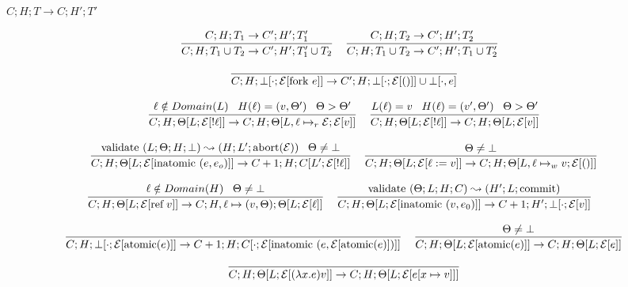 \documentclass[9pt]{article}
\newcommand{\eval}[1]{\mathcal{E}[#1]}
\newcommand{\ctxt}[0]{\mathcal{E}}
\newcommand{\loc}[0]{\ell}
\newcommand{\atomic}[1]{\text{atomic}(#1)}
\newcommand{\alloc}[1]{\text{ref} \; #1}
\newcommand{\commit}[0]{\text{commit}}
\newcommand{\abort}[1]{\text{abort}(#1)}
\newcommand{\fork}[1]{\text{fork } #1}
\newcommand{\inatomic}[1]{\text{inatomic }(#1)}
\newcommand{\validate}[1]{\text{validate }(#1)}
\begin{document}
$\boxed{C; H; T \rightarrow C; H' ;T'}$

\[%
\infer[]{C; H; T_1 \cup T_2 \rightarrow C'; H'; T_1' \cup T_2}{C; H; T_1 \rightarrow C'; H'; T_1'} \;\;\;
\infer[]{C; H; T_1 \cup T_2 \rightarrow C'; H'; T_1 \cup T_2'}{C; H; T_2 \rightarrow C'; H'; T_2'} \;\;\; 
\]

\[%
\infer[]{C; H; \bot[\cdot; \eval{\fork{e}}] \rightarrow C'; H; \bot[\cdot; \eval{()}] \cup \bot[\cdot, e]}{}
\]

\[%
\infer[]{C; H; \Theta[L; \eval{!\loc}] \rightarrow C; H; \Theta[L, \loc \mapsto_r \ctxt; \eval{v}]}{\loc \notin Domain(L) \;\;\; H(\loc) = (v, \Theta') \;\;\; \Theta > \Theta'}  \;\;\;
\infer[]{C; H; \Theta[L; \eval{!\loc}] \rightarrow C; H; \Theta[L; \eval{v}]}{L(\loc) = v \;\;\; H(\loc) = (v', \Theta') \;\;\; \Theta > \Theta'} 
\]

\[%
\infer[]{C; H; \Theta[L; \eval{\inatomic{e, e_o}}] \rightarrow C+1; H; C[L'; \ctxt[!\loc]]}{\validate{L; \Theta; H; \bot} \leadsto (H; L'; \abort{\ctxt}) \;\;\; \Theta \neq \bot} \;\;\;
\infer[]{C; H; \Theta[L; \eval{\loc := v}] \rightarrow C; H; \Theta[L, \loc \mapsto_w v; \eval{()}]}{\Theta \neq \bot} 
\]

\[%
\infer[]{C; H; \Theta[L; \eval{\alloc{v}}] \rightarrow C; H, \loc \mapsto (v, \Theta); \Theta[L;  \eval{\loc}]}{\loc \notin Domain(H) \;\;\; \Theta \neq \bot} \;\;\;
\infer[]{C; H; \Theta[L; \eval{\inatomic{v, e_0}}] \rightarrow C+1; H'; \bot[\cdot; \eval{v}]}{\validate{\Theta; L; H; C} \leadsto (H'; L; \commit)} \;\;\;
\]

\[
\infer[]{C; H; \bot[\cdot; \eval{\atomic{e}}] \rightarrow C+1; H; C[\cdot; \eval{\inatomic{e, \eval{\atomic{e}}}}]}{} \;\;\;
\infer[]{C; H; \Theta[L; \eval{\atomic{e}}] \rightarrow C; H; \Theta[L; \eval{e}]}{\Theta \neq \bot}
\]

\[
\infer[]{C; H; \Theta[L; \eval{(\lambda x. e) v}] \rightarrow C; H; \Theta[L; \eval{e[x\mapsto v]}]}{}
\]
\end{document}
